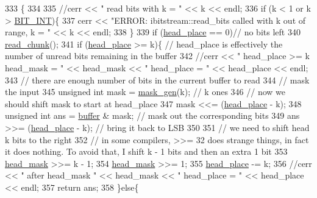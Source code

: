 \begin{DoxyCode}
333                                                 \{
334 
335   \textcolor{comment}{//cerr << " read bits with k = " << k << endl;}
336   \textcolor{keywordflow}{if} (k < 1 or k > \hyperlink{bitstream_8h_afcadf5aa65c5159bfb96c4d82ebc0a5d}{BIT\_INT})\{
337     cerr << \textcolor{stringliteral}{"ERROR: ibitstream::read\_bits called with k out of range, k = "} << k << endl;
338   \}
339   \textcolor{keywordflow}{if} (\hyperlink{classibitstream_a7b96359ac1534a5565e6e9b0cc53a0b3}{head\_place} == 0)\textcolor{comment}{// no bits left}
340     \hyperlink{classibitstream_ac62c26004436d83f337f4aeba0895e20}{read\_chunk}();
341   \textcolor{keywordflow}{if} (\hyperlink{classibitstream_a7b96359ac1534a5565e6e9b0cc53a0b3}{head\_place} >= k)\{ \textcolor{comment}{// head\_place is effectively the number of unread bits remaining in the
       buffer}
342     \textcolor{comment}{//cerr << " head\_place >= k head\_mask = " << head\_mask << " head\_place = " << head\_place << endl;}
343     \textcolor{comment}{// there are enough number of bits in the current buffer to read}
344     \textcolor{comment}{// mask the input}
345     \textcolor{keywordtype}{unsigned} \textcolor{keywordtype}{int} mask = \hyperlink{bitstream_8cpp_a6364b017a9400a38f7a994376bb3ebee}{mask\_gen}(k); \textcolor{comment}{// k ones}
346     \textcolor{comment}{// now we should shift mask to start at head\_place}
347     mask <<= (\hyperlink{classibitstream_a7b96359ac1534a5565e6e9b0cc53a0b3}{head\_place} - k);
348     \textcolor{keywordtype}{unsigned} \textcolor{keywordtype}{int} ans = \hyperlink{classibitstream_a73f0b24d3d4402369f1abbb43f7f70ef}{buffer} & mask; \textcolor{comment}{// mask out the corresponding bits}
349     ans >>= (\hyperlink{classibitstream_a7b96359ac1534a5565e6e9b0cc53a0b3}{head\_place} - k); \textcolor{comment}{// bring it back to LSB}
350 
351     \textcolor{comment}{// we need to shift head k bits to the right}
352     \textcolor{comment}{// in some compilers, >>= 32 does strange things, in fact it does nothing. To avoid that, I shift k - 1
       bits and then an extra 1 bit}
353     \hyperlink{classibitstream_a48cd41991b6c29ea5120b53873a72a70}{head\_mask} >>= k - 1;
354     \hyperlink{classibitstream_a48cd41991b6c29ea5120b53873a72a70}{head\_mask} >>= 1;
355     \hyperlink{classibitstream_a7b96359ac1534a5565e6e9b0cc53a0b3}{head\_place} -= k;
356     \textcolor{comment}{//cerr << " after head\_mask " << head\_mask << " head\_place = " << head\_place << endl;}
357     \textcolor{keywordflow}{return} ans;
358   \}\textcolor{keywordflow}{else}\{

\end{DoxyCode}
